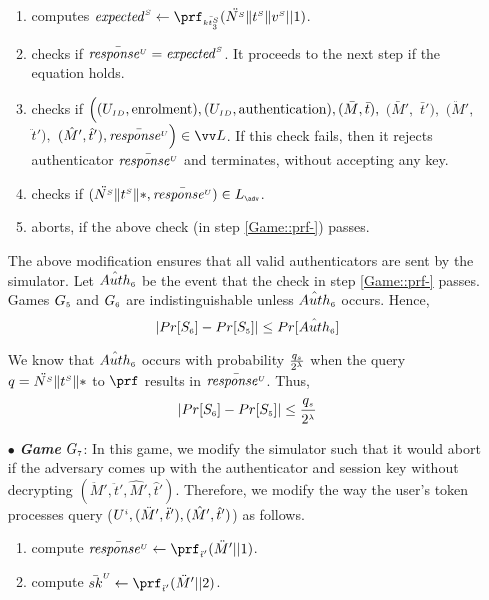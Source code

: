 \begin{itemize}
\begin{enumerate}
%
\item computes $\VS{\mathit{expected}} \gets \prf_{\sss\bar{\VS{\keyt_{\sss3}}}}(\ddot{\VS{\nonce}}  \| \VS{\trans} \| \VS{\verifier}||1)$.
%
\item checks if $\bar{\mathit{response}^{\scriptscriptstyle U}}=\mathit{expected}^{\scriptscriptstyle S}$. It proceeds to the next step if the equation holds. 
%
\item\label{Game::check-sim-} checks if $\Big((U_{\scriptscriptstyle  ID},  \text{enrolment}), (U_{\scriptscriptstyle  ID},  \text{authentication}), (\bar M, \bar t),$ $ (\bar M',$ $ \bar t'),$ $ (\ddot M', $ $\ddot t'), $ $(\hat M', \hat t'), \bar{\VC{\mathit{response}}}\Big)\in \vv L$. If this check fails, then it rejects authenticator  $\bar{\mathit{response}^{\scriptscriptstyle U}}$ and terminates, without accepting any key.

\item\label{Game::prf-} checks if $(\ddot{\VS{\nonce}}  \| \VS{\trans} \| *,\bar{\VC{\mathit{response}}})\in L_{\sss \adv}$.  
%
\item aborts, if the above check (in step \ref{Game::prf-}) passes.
%
\end{enumerate}

The above modification ensures that all valid authenticators are sent by the simulator. Let $\hat {Auth}_{\scriptscriptstyle  6}$ be the event that the check in step \ref{Game::prf-} passes. Games $G_{\scriptscriptstyle  5}$ and $G_{\scriptscriptstyle  6}$ are indistinguishable unless $\hat {Auth}_{\scriptscriptstyle  6}$ occurs. Hence,
%
$$|Pr[S_{\scriptscriptstyle  6}]-Pr[S_{\scriptscriptstyle  5}]|\leq Pr[\hat {Auth}_{\scriptscriptstyle  6}]$$


We know that $\hat {Auth}_{\scriptscriptstyle  6}$ occurs with probability $ \frac{q_{\scriptscriptstyle  s}}{2^{\scriptscriptstyle \lambda}}$ when the query $q=\ddot{{N}^{\scriptscriptstyle S}}  \| {t}^{\scriptscriptstyle S} \| *$ to $\prf$ results in $\bar{\mathit{response}^{\scriptscriptstyle U}}$. Thus, 
%
\begin{equation}\label{eq::game_6}
|Pr[S_{\scriptscriptstyle  6}]-Pr[S_{\scriptscriptstyle  5}]|\leq \frac{q_{\scriptscriptstyle  s}}{2^{\scriptscriptstyle \lambda}}
\end{equation}

\item[$\bullet$] \textit{\textbf{Game}}  $G_{\scriptscriptstyle  7}$: In this game, we modify the simulator such that it would abort if the adversary comes up with the authenticator and session key without decrypting  $ (\ddot M', \ddot t', \hat M', \hat t')$.  Therefore, we modify the way the user's token processes query \send($U^{\scriptscriptstyle  i}, (\ddot M', \ddot t'), (\hat M', \hat t')$) as follows.
 \begin{enumerate}
 \item compute $\bar{\VC{\mathit{response}}} \gets \prf_{\sss  \ddot t'}( \ddot M'|| 1)$.
 \item compute $\bar {sk}^{\sss U}\gets \prf_{\sss  \ddot t'}( \ddot M'|| 2)$.
 \end{enumerate}


\end{itemize}
